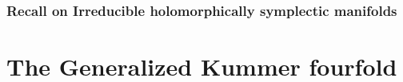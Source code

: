 \documentclass[a4paper]{article}
\begin{document}
\section{Recall on Irreducible holomorphically symplectic manifolds}


\part{The Generalized Kummer fourfold}\label{integralcohomology}






\appendix



\end{document}
